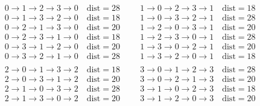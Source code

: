 \appendix
	\begin{table}[h]
		\[
		\begin{split}
			&0 \rightarrow 1 \rightarrow 2 \rightarrow 3 \rightarrow 0 \quad \text{dist}=28 \hspace{1cm} 1 \rightarrow 0 \rightarrow 2 \rightarrow 3 \rightarrow 1 \quad \text{dist}=18 \\
			&0 \rightarrow 1 \rightarrow 3 \rightarrow 2 \rightarrow 0 \quad \text{dist}=18 \hspace{1cm} 1 \rightarrow 0 \rightarrow 3 \rightarrow 2 \rightarrow 1 \quad \text{dist}=28\\
			&0 \rightarrow 2 \rightarrow 1 \rightarrow 3 \rightarrow 0 \quad \text{dist}=20 \hspace{1cm} 1 \rightarrow 2 \rightarrow 0 \rightarrow 3 \rightarrow 1 \quad \text{dist}=20\\
			&0 \rightarrow 2 \rightarrow 3 \rightarrow 1 \rightarrow 0 \quad \text{dist}=18 \hspace{1cm} 1 \rightarrow 2 \rightarrow 3 \rightarrow 0 \rightarrow 1 \quad \text{dist}=28\\
			&0 \rightarrow 3 \rightarrow 1 \rightarrow 2 \rightarrow 0 \quad \text{dist}=20 \hspace{1cm} 1 \rightarrow 3 \rightarrow 0 \rightarrow 2 \rightarrow 1 \quad \text{dist}=20\\
			&0 \rightarrow 3 \rightarrow 2 \rightarrow 1 \rightarrow 0 \quad \text{dist}=28 \hspace{1cm} 1 \rightarrow 3 \rightarrow 2 \rightarrow 0 \rightarrow 1 \quad \text{dist}=18\\ \\
			&2 \rightarrow 0 \rightarrow 1 \rightarrow 3 \rightarrow 2 \quad \text{dist}=18 \hspace{1cm} 3 \rightarrow 0 \rightarrow 1 \rightarrow 2 \rightarrow 3 \quad \text{dist}=28 \\
			&2 \rightarrow 0 \rightarrow 3 \rightarrow 1 \rightarrow 2 \quad \text{dist}=20 \hspace{1cm} 3 \rightarrow 0 \rightarrow 2 \rightarrow 1 \rightarrow 3 \quad \text{dist}=20\\
			&2 \rightarrow 1 \rightarrow 0 \rightarrow 3 \rightarrow 2 \quad \text{dist}=28 \hspace{1cm} 3 \rightarrow 1 \rightarrow 0 \rightarrow 2 \rightarrow 3 \quad \text{dist}=18\\
			&2 \rightarrow 1 \rightarrow 3 \rightarrow 0 \rightarrow 2 \quad \text{dist}=20 \hspace{1cm} 3 \rightarrow 1 \rightarrow 2 \rightarrow 0 \rightarrow 3 \quad \text{dist}=20\\

\end{split}\]
\end{table}
